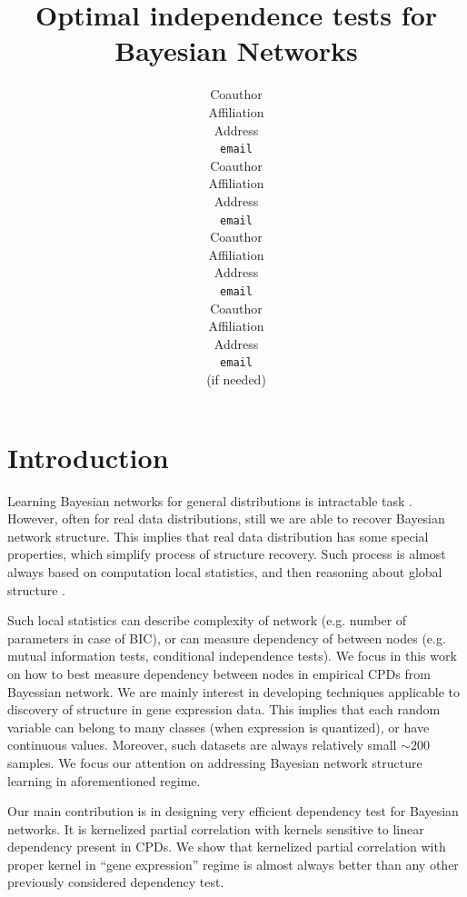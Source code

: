 \documentclass{article} %
\title{Optimal independence tests for Bayesian Networks}
\author{
\And
Coauthor \\
Affiliation \\
Address \\
\texttt{email} \\
\AND
Coauthor \\
Affiliation \\
Address \\
\texttt{email} \\
\And
Coauthor \\
Affiliation \\
Address \\
\texttt{email} \\
\And
Coauthor \\
Affiliation \\
Address \\
\texttt{email} \\
(if needed)\\
}
\begin{document}
\maketitle

\begin{abstract}

\end{abstract}


\section{Introduction}
Learning Bayesian networks for general distributions is
intractable task \cite{chickering1996learning}. However, often
for real data distributions, still we are able to 
recover Bayesian network structure. This implies that real data
distribution has some special properties, which simplify process
of structure recovery. Such process is almost always
based on computation local statistics, and then 
reasoning about global structure \cite{jaakkola2010learning, tsamardinos2006max}. 


Such local statistics can describe
complexity of network (e.g. number of parameters in case of BIC\cite{schwarz1978estimating}), or
can measure dependency of between nodes (e.g. mutual information tests, 
conditional independence tests). 
We focus in this work on how to best measure dependency between nodes
in empirical CPDs from Bayessian network. We are mainly interest
in developing techniques applicable to discovery of structure
in gene expression data. This implies that each random variable
can belong to many classes (when expression is quantized), or have continuous
values. Moreover, such datasets are always relatively small $\sim200$ samples.
We focus our attention on addressing Bayesian network structure learning
in aforementioned regime. 


Our main contribution is in designing very efficient dependency test
for Bayesian networks. It is kernelized partial correlation with
kernels sensitive to linear dependency present in CPDs. We show
that kernelized partial correlation with proper kernel in ``gene expression''
regime is almost always better than any other previously considered
dependency test. 
\end{document}
